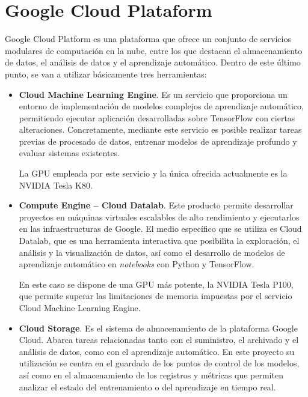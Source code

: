 \section{Google Cloud Plataform} \label{Chapter:GoogleCloud}

Google Cloud Platform es una plataforma que ofrece un conjunto de servicios modulares de computación en la nube, entre los que destacan el almacenamiento de datos, el análisis de datos y el aprendizaje automático. Dentro de este último punto, se van a utilizar básicamente tres herramientas: \begin{itemize}
  \item \textbf{Cloud Machine Learning Engine}. Es un servicio que proporciona un entorno de implementación de modelos complejos de aprendizaje automático, permitiendo ejecutar aplicación desarrolladas sobre TensorFlow con ciertas alteraciones. Concretamente, mediante este servicio es posible realizar tareas previas de procesado de datos, entrenar modelos de aprendizaje profundo y evaluar sistemas existentes.
  
  La GPU empleada por este servicio y la única ofrecida actualmente es la NVIDIA Tesla K80.
  \item \textbf{Compute Engine -- Cloud Datalab}. Este producto permite desarrollar proyectos en máquinas virtuales escalables de alto rendimiento y ejecutarlos en las infraestructuras de Google. El medio específico que se utiliza es Cloud Datalab, que es una herramienta interactiva que posibilita la exploración, el análisis y la visualización de datos, así como el desarrollo de modelos de aprendizaje automático en \textit{notebooks} con Python y TensorFlow.
  
  En este caso se dispone de una GPU más potente, la NVIDIA Tesla P100, que permite superar las limitaciones de memoria impuestas por el servicio Cloud Machine Learning Engine.
  \item \textbf{Cloud Storage}. Es el sistema de almacenamiento de la plataforma Google Cloud. Abarca tareas relacionadas tanto con el suministro, el archivado y el análisis de datos, como con el aprendizaje automático. En este proyecto su utilización se centra en el guardado de los puntos de control de los modelos, así como en el almacenamiento de los registros y métricas que permiten analizar el estado del entrenamiento o del aprendizaje en tiempo real. 
\end{itemize}

